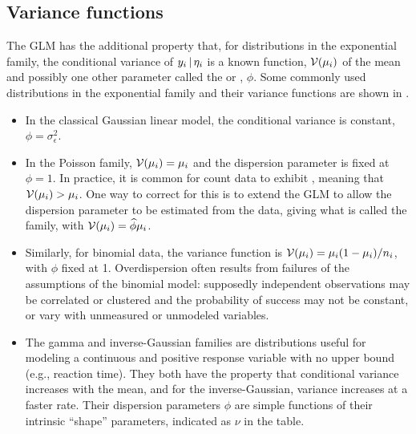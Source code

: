 \documentclass[11pt]{book}\usepackage[]{graphicx}\usepackage[]{color}
\begin{document}
\subsection{Variance functions}
The GLM has the additional property that, for distributions in the exponential family,
the conditional variance of $y_i \, | \, \eta_i$ is a known function, $\mathcal{V} (\mu_i)$
of the mean and possibly one other parameter called the  or
, $\phi$. Some commonly used distributions in the 
exponential family and their variance functions are shown in .



\begin{itemize}
\item In the classical Gaussian linear model, the conditional variance is constant,
$\phi = \sigma^2_\epsilon$. 

\item In the Poisson family, $\mathcal{V} (\mu_i) = \mu_i$
and the dispersion parameter is fixed at $\phi = 1$.
In practice, it is common for count data to exhibit ,
meaning that $\mathcal{V} (\mu_i) > \mu_i$.  One way to correct for this is to extend
the GLM to allow the dispersion parameter to be estimated from the data,
giving what is called the  family, with $\mathcal{V} (\mu_i) = \widehat{\phi} \mu_i$.

\item Similarly, for binomial data, the variance function is $\mathcal{V} (\mu_i) = \mu_i (1-\mu_i) / n_i$,
with $\phi$ fixed at 1.
Overdispersion often results from failures of the assumptions of the binomial model:
supposedly independent observations may be correlated or clustered and the probability
of success may not be constant, or vary with unmeasured or unmodeled variables.

\item The gamma and inverse-Gaussian families are distributions useful for modeling a continuous
and positive response variable with no upper bound (e.g., reaction time). They both have the 
property that conditional variance increases with the mean, and for the inverse-Gaussian,
variance increases at a faster rate.  Their dispersion parameters $\phi$ are simple functions
of their intrinsic ``shape'' parameters, indicated as $\nu$ in the table.  

\end{itemize}
\end{document}
